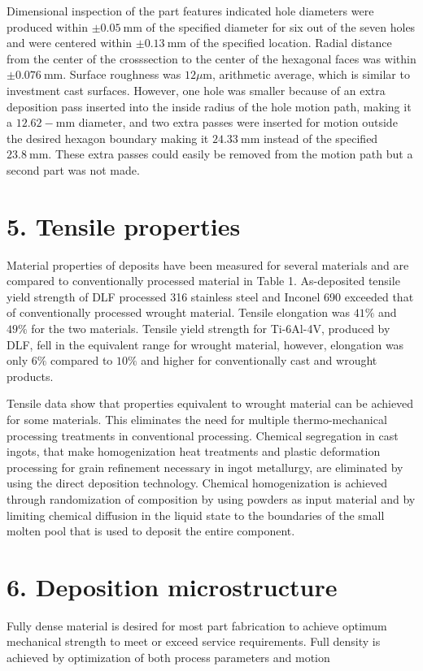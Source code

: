 \documentclass[10pt]{article}
\begin{document}
Dimensional inspection of the part features indicated hole diameters were produced within $\pm 0.05 \mathrm{~mm}$ of the specified diameter for six out of the seven holes and were centered within $\pm 0.13 \mathrm{~mm}$ of the specified location. Radial distance from the center of the crosssection to the center of the hexagonal faces was within $\pm 0.076 \mathrm{~mm}$. Surface roughness was $12 \mu \mathrm{m}$, arithmetic average, which is similar to investment cast surfaces. However, one hole was smaller because of an extra deposition pass inserted into the inside radius of the hole motion path, making it a $12.62-\mathrm{mm}$ diameter, and two extra passes were inserted for motion outside the desired hexagon boundary making it $24.33 \mathrm{~mm}$ instead of the specified $23.8 \mathrm{~mm}$. These extra passes could easily be removed from the motion path but a second part was not made.

\section*{5. Tensile properties}
Material properties of deposits have been measured for several materials and are compared to conventionally processed material in Table 1. As-deposited tensile yield strength of DLF processed 316 stainless steel and Inconel 690 exceeded that of conventionally processed wrought material. Tensile elongation was $41 \%$ and $49 \%$ for the two materials. Tensile yield strength for Ti-6Al-4V, produced by DLF, fell in the equivalent range for wrought material, however, elongation was only $6 \%$ compared to $10 \%$ and higher for conventionally cast and wrought products.

Tensile data show that properties equivalent to wrought material can be achieved for some materials. This eliminates the need for multiple thermo-mechanical processing treatments in conventional processing. Chemical segregation in cast ingots, that make homogenization heat treatments and plastic deformation processing for grain refinement necessary in ingot metallurgy, are eliminated by using the direct deposition technology. Chemical homogenization is achieved through randomization of composition by using powders as input material and by limiting chemical diffusion in the liquid state to the boundaries of the small molten pool that is used to deposit the entire component.

\section*{6. Deposition microstructure}
Fully dense material is desired for most part fabrication to achieve optimum mechanical strength to meet or exceed service requirements. Full density is achieved by optimization of both process parameters and motion
\end{document}
